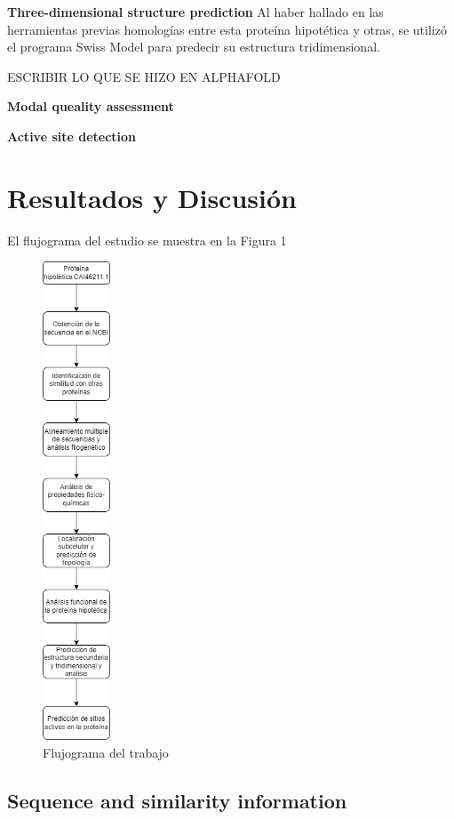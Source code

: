\documentclass[journal,transmag]{IEEEtran}
\begin{document}
\textbf{ Three-dimensional structure prediction}
Al haber hallado en las herramientas previas homologías entre esta proteína hipotética y otras, se utilizó el programa Swiss Model para predecir su estructura tridimensional.

ESCRIBIR LO QUE SE HIZO EN ALPHAFOLD

\textbf{ Modal queality assessment}

\textbf{ Active site detection}


\section{Resultados y Discusión}
El flujograma del estudio se muestra en la Figura 1
	\begin{figure}[!h]
		\center
		\includegraphics[width=2cm]{imagenes/flujograma.png}
		\caption{Flujograma del trabajo}
		\label{1}
	\end{figure}

\subsection{\textbf{ Sequence and similarity information}}
\end{document}

